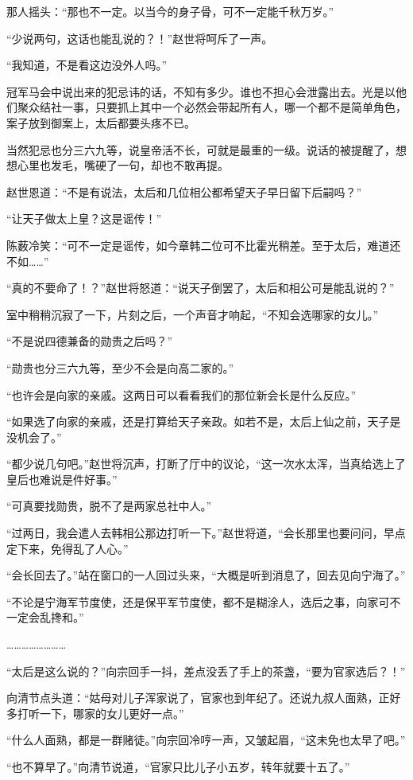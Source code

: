 那人摇头：“那也不一定。以当今的身子骨，可不一定能千秋万岁。”

“少说两句，这话也能乱说的？！”赵世将呵斥了一声。

“我知道，不是看这边没外人吗。”

冠军马会中说出来的犯忌讳的话，不知有多少。谁也不担心会泄露出去。光是以他们聚众结社一事，只要抓上其中一个必然会带起所有人，哪一个都不是简单角色，案子放到御案上，太后都要头疼不已。

当然犯忌也分三六九等，说皇帝活不长，可就是最重的一级。说话的被提醒了，想想心里也发毛，嘴硬了一句，却也不敢再提。

赵世恩道：“不是有说法，太后和几位相公都希望天子早日留下后嗣吗？”

“让天子做太上皇？这是谣传！”

陈薮冷笑：“可不一定是谣传，如今章韩二位可不比霍光稍差。至于太后，难道还不如……”

“真的不要命了！？”赵世将怒道：“说天子倒罢了，太后和相公可是能乱说的？”

室中稍稍沉寂了一下，片刻之后，一个声音才响起，“不知会选哪家的女儿。”

“不是说四德兼备的勋贵之后吗？”

“勋贵也分三六九等，至少不会是向高二家的。”

“也许会是向家的亲戚。这两日可以看看我们的那位新会长是什么反应。”

“如果选了向家的亲戚，还是打算给天子亲政。如若不是，太后上仙之前，天子是没机会了。”

“都少说几句吧。”赵世将沉声，打断了厅中的议论，“这一次水太浑，当真给选上了皇后也难说是件好事。”

“可真要找勋贵，脱不了是两家总社中人。”

“过两日，我会遣人去韩相公那边打听一下。”赵世将道，“会长那里也要问问，早点定下来，免得乱了人心。”

“会长回去了。”站在窗口的一人回过头来，“大概是听到消息了，回去见向宁海了。”

“不论是宁海军节度使，还是保平军节度使，都不是糊涂人，选后之事，向家可不一定会乱搀和。”

……………………

“太后是这么说的？”向宗回手一抖，差点没丢了手上的茶盏，“要为官家选后？！”

向清节点头道：“姑母对儿子浑家说了，官家也到年纪了。还说九叔人面熟，正好多打听一下，哪家的女儿更好一点。”

“什么人面熟，都是一群赌徒。”向宗回冷哼一声，又皱起眉，“这未免也太早了吧。”

“也不算早了。”向清节说道，“官家只比儿子小五岁，转年就要十五了。”

